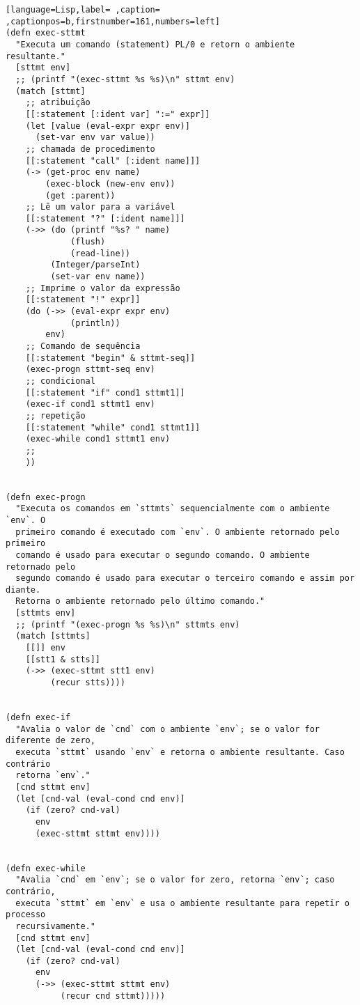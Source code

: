 \documentclass{scrartcl}
\begin{document}
\begin{lstlisting}[language=Lisp,label= ,caption= ,captionpos=b,firstnumber=161,numbers=left]
(defn exec-sttmt
  "Executa um comando (statement) PL/0 e retorn o ambiente resultante."
  [sttmt env]
  ;; (printf "(exec-sttmt %s %s)\n" sttmt env)
  (match [sttmt]
    ;; atribuição
    [[:statement [:ident var] ":=" expr]]
    (let [value (eval-expr expr env)]
      (set-var env var value))
    ;; chamada de procedimento
    [[:statement "call" [:ident name]]]
    (-> (get-proc env name)
        (exec-block (new-env env))
        (get :parent))
    ;; Lê um valor para a variável
    [[:statement "?" [:ident name]]]
    (->> (do (printf "%s? " name)
             (flush)
             (read-line))
         (Integer/parseInt)
         (set-var env name))
    ;; Imprime o valor da expressão
    [[:statement "!" expr]]
    (do (->> (eval-expr expr env)
             (println))
        env)
    ;; Comando de sequência
    [[:statement "begin" & sttmt-seq]]
    (exec-progn sttmt-seq env)
    ;; condicional
    [[:statement "if" cond1 sttmt1]]
    (exec-if cond1 sttmt1 env)
    ;; repetição
    [[:statement "while" cond1 sttmt1]]
    (exec-while cond1 sttmt1 env)
    ;;
    ))


(defn exec-progn
  "Executa os comandos em `sttmts` sequencialmente com o ambiente `env`. O
  primeiro comando é executado com `env`. O ambiente retornado pelo primeiro
  comando é usado para executar o segundo comando. O ambiente retornado pelo
  segundo comando é usado para executar o terceiro comando e assim por diante.
  Retorna o ambiente retornado pelo último comando."
  [sttmts env]
  ;; (printf "(exec-progn %s %s)\n" sttmts env)
  (match [sttmts]
    [[]] env
    [[stt1 & stts]]
    (->> (exec-sttmt stt1 env)
         (recur stts))))


(defn exec-if
  "Avalia o valor de `cnd` com o ambiente `env`; se o valor for diferente de zero,
  executa `sttmt` usando `env` e retorna o ambiente resultante. Caso contrário
  retorna `env`."
  [cnd sttmt env]
  (let [cnd-val (eval-cond cnd env)]
    (if (zero? cnd-val)
      env
      (exec-sttmt sttmt env))))


(defn exec-while
  "Avalia `cnd` em `env`; se o valor for zero, retorna `env`; caso contrário,
  executa `sttmt` em `env` e usa o ambiente resultante para repetir o processo
  recursivamente."
  [cnd sttmt env]
  (let [cnd-val (eval-cond cnd env)]
    (if (zero? cnd-val)
      env
      (->> (exec-sttmt sttmt env)
           (recur cnd sttmt)))))
\end{lstlisting}
\end{document}
